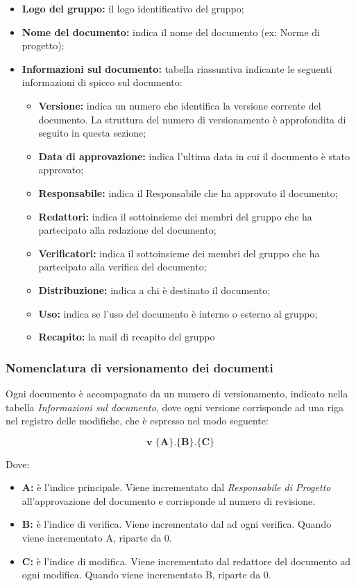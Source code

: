 \documentclass[../NormediProgetto.tex]{subfiles}
\begin{document}
\begin{itemize}
	\item \textbf{Logo del gruppo:} il logo identificativo del gruppo;
	\item \textbf{Nome del documento:} indica il nome del documento (ex: Norme di progetto);
	\item \textbf{Informazioni sul documento:} tabella riassuntiva indicante le seguenti informazioni di spicco sul documento:
	\begin{itemize}
		\item \textbf{Versione:} indica un numero che identifica la versione corrente del documento. La struttura del numero di versionamento è approfondita di seguito in questa sezione;
		\item \textbf{Data di approvazione:} indica l'ultima data in cui il documento è stato approvato;
		\item \textbf{Responsabile:} indica il Responsabile che ha approvato il documento;
		\item \textbf{Redattori:} indica il sottoinsieme dei membri del gruppo che ha partecipato alla redazione del documento;
		\item \textbf{Verificatori:} indica il sottoinsieme dei membri del gruppo che ha partecipato alla verifica del documento;
		\item \textbf{Distribuzione:} indica a chi è destinato il documento;
		\item \textbf{Uso:} indica se l'uso del documento è interno o esterno al gruppo;          
		\item \textbf{Recapito:} la mail di recapito del gruppo
	\end{itemize}
	
\end{itemize}

\subsubsection{Nomenclatura di versionamento dei documenti}
Ogni documento è accompagnato da un numero di versionamento, indicato nella tabella \textit{Informazioni sul documento}, dove ogni versione corrisponde ad una riga nel registro delle modifiche, che è espresso nel modo seguente:

\[\textbf{v $\biggl\{$A$\biggr\}$.$\biggl\{$B$\biggr\}$.$\biggl\{$C$\biggr\}$}\]

Dove:

\begin{itemize}
	\item{\textbf{A:}} è l'indice principale. Viene incrementato dal \textit{Responsabile di Progetto} all’approvazione del documento e 
	corrisponde al numero di revisione.
	\item{\textbf{B:}} è l'indice di verifica. Viene incrementato dal  ad ogni verifica. Quando viene incrementato A, riparte da 0.
	\item{\textbf{C:}} è l'indice di modifica. Viene incrementato dal redattore del documento ad ogni modifica. Quando viene incrementato B, riparte da 0.
\end{itemize}
\end{document}
